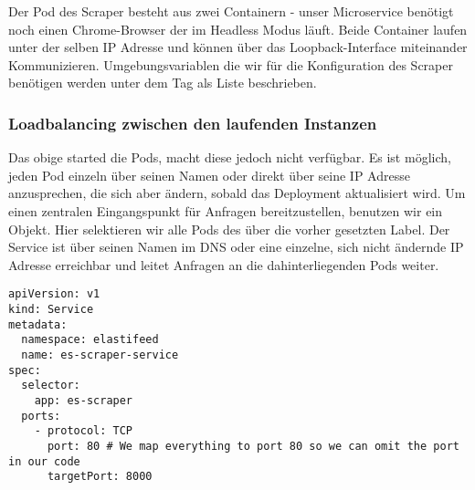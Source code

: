 Der Pod des Scraper besteht aus zwei Containern - unser Microservice benötigt noch einen Chrome-Browser der im Headless Modus läuft.
Beide Container laufen unter der selben IP Adresse und können über das Loopback-Interface miteinander Kommunizieren.
Umgebungsvariablen die wir für die Konfiguration des Scraper benötigen werden unter dem  Tag als Liste beschrieben.

\endsubsubsection

\subsubsection{Loadbalancing zwischen den laufenden Instanzen}
Das obige  started die Pods, macht diese jedoch nicht verfügbar.
Es ist möglich, jeden Pod einzeln über seinen Namen oder direkt über seine IP Adresse anzusprechen, die sich aber ändern, sobald das Deployment aktualisiert wird.
Um einen zentralen Eingangspunkt für Anfragen bereitzustellen, benutzen wir ein  Objekt.
Hier selektieren wir alle Pods des  über die vorher gesetzten Label.
Der Service ist über seinen Namen im DNS oder eine einzelne, sich nicht ändernde IP Adresse erreichbar und leitet Anfragen an die dahinterliegenden Pods weiter.
\begin{lstlisting}
apiVersion: v1
kind: Service
metadata:
  namespace: elastifeed
  name: es-scraper-service
spec:
  selector:
    app: es-scraper
  ports:
    - protocol: TCP
      port: 80 # We map everything to port 80 so we can omit the port in our code
      targetPort: 8000
\end{lstlisting}
\endsubsubsection

